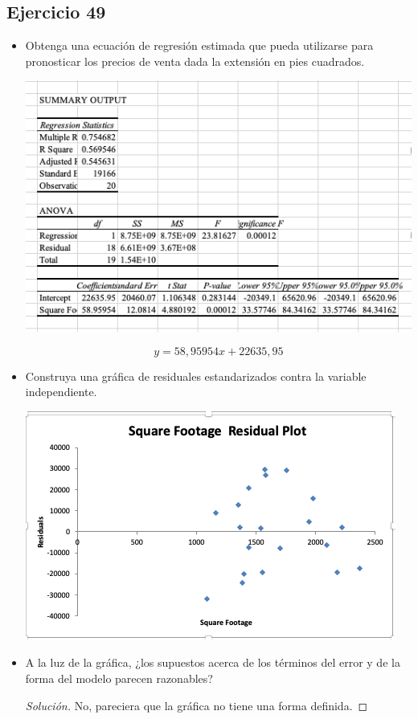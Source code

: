\documentclass[a4paper,12pt]{article}
\newenvironment{solution}
  {\renewcommand\qedsymbol{$\blacksquare$}\begin{proof}[Solución]}
  {\end{proof}}
\begin{document}
\subsection{Ejercicio 49}
\begin{itemize}
    \item Obtenga una ecuación de regresión estimada que pueda utilizarse para pronosticar los precios de venta dada la extensión en pies cuadrados.
    \begin{center}
        \includegraphics[scale=0.7]{Imagenes/49-1.png}
    \end{center}
    $$y=58,95954x+22635,95$$
    \item Construya una gráfica de residuales estandarizados contra la variable independiente.
    \begin{center}
        \includegraphics[scale=0.7]{Imagenes/49-2.png}
    \end{center}
    \item A la luz de la gráfica, ¿los supuestos acerca de los términos del error y de la forma del modelo parecen razonables?
    \begin{solution}
    No, pareciera que la gráfica no tiene una forma definida.
    \end{solution}
\end{itemize}
\end{document}
